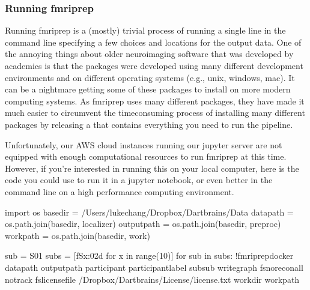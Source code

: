 \documentclass[letterpaper,10pt,english]{sphinxmanual}
\begin{document}


\subsubsection{Running fmriprep}
\label{\detokenize{content/Preprocessing:running-fmriprep}}
Running fmriprep is a (mostly) trivial process of running a single line in the command line specifying a few choices and locations for the output data. One of the annoying things about older neuroimaging software that was developed by academics is that the packages were developed using many different development environments and on different operating systems (e.g., unix, windows, mac). It can be a nightmare getting some of these packages to install on more modern computing systems. As fmriprep uses many different packages, they have made it much easier to circumvent the time\sphinxhyphen{}consuming process of installing many different packages by releasing a  that contains everything you need to run the pipeline.

Unfortunately, our AWS cloud instances running our jupyter server are not equipped with enough computational resources to run fmriprep at this time. However, if you’re interested in running this on your local computer, here is the code you could use to run it in a jupyter notebook, or even better in the command line on a high performance computing environment.

\begin{sphinxVerbatim}[commandchars=\\\{\}]
import os
base\PYGZus{}dir = \PYGZsq{}/Users/lukechang/Dropbox/Dartbrains/Data\PYGZsq{}
data\PYGZus{}path = os.path.join(base\PYGZus{}dir, \PYGZsq{}localizer\PYGZsq{})
output\PYGZus{}path = os.path.join(base\PYGZus{}dir, \PYGZsq{}preproc\PYGZsq{})
work\PYGZus{}path = os.path.join(base\PYGZus{}dir, \PYGZsq{}work\PYGZsq{})

sub = \PYGZsq{}S01\PYGZsq{}
subs = [f\PYGZsq{}S\PYGZob{}x:0\PYGZgt{}2d\PYGZcb{}\PYGZsq{} for x in range(10)]
for sub in subs:
    !fmriprep\PYGZhy{}docker \PYGZob{}data\PYGZus{}path\PYGZcb{} \PYGZob{}output\PYGZus{}path\PYGZcb{} participant \PYGZhy{}\PYGZhy{}participant\PYGZus{}label sub\PYGZhy{}\PYGZob{}sub\PYGZcb{} \PYGZhy{}\PYGZhy{}write\PYGZhy{}graph \PYGZhy{}\PYGZhy{}fs\PYGZhy{}no\PYGZhy{}reconall \PYGZhy{}\PYGZhy{}notrack \PYGZhy{}\PYGZhy{}fs\PYGZhy{}license\PYGZhy{}file \PYGZti{}/Dropbox/Dartbrains/License/license.txt \PYGZhy{}\PYGZhy{}work\PYGZhy{}dir \PYGZob{}work\PYGZus{}path\PYGZcb{}
\end{sphinxVerbatim}
\end{document}

